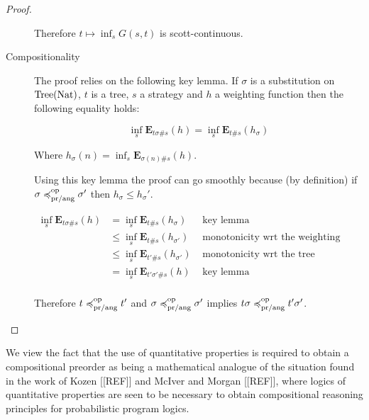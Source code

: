 \begin{proof}
\begin{description}
            Therefore $t \mapsto \inf_s G(s,t)$ is scott-continuous.
        \item[Compositionality]

            The proof relies on the following key lemma. 
            If $\sigma$ is a substitution on $\textnormal{Tree}(\textnormal{Nat})$,
            $t$ is a tree, $s$ a strategy and $h$ a weighting function then
            the following equality holds:


            \begin{equation*}
                \inf_s \mathbf{E}_{t\sigma \# s } (h)
                = 
                \inf_s \mathbf{E}_{t \# s} (h_\sigma)
            \end{equation*}

            Where $h_\sigma (n) = \inf_s \mathbf{E}_{\sigma(n) \# s} (h)$.

            
            Using this key lemma the proof can go smoothly because (by
            definition)
            if $\sigma \preccurlyeq^{\text{op}}_{\text{pr/ang}} \sigma'$ then 
            $h_\sigma \leq h_\sigma'$.

            \begin{align*}
                \inf_s \mathbf{E}_{t\sigma \# s} (h)
                 & = \inf_s \mathbf{E}_{t \# s} (h_\sigma)       & \text{ key lemma }  \\
                 & \leq \inf_s \mathbf{E}_{t \# s} (h_{\sigma'}) & \text{ monotonicity wrt the weighting function } \\
                 & \leq \inf_s \mathbf{E}_{t'\# s} (h_{\sigma'}) & \text{ monotonicity wrt the tree } \\
                 & = \inf_s \mathbf{E}_{t'\sigma' \# s} (h )     & \text{ key lemma } \\
            \end{align*}

            Therefore $ t \preccurlyeq^{\text{op}}_{\text{pr/ang}} t'$ and $\sigma
            \preccurlyeq^{\text{op}}_{\text{pr/ang}} \sigma'$ implies $t\sigma \preccurlyeq^{\text{op}}_{\text{pr/ang}}
            t'\sigma'$.
    \end{description}

\end{proof}

We view the fact that the use of quantitative properties is required to obtain a compositional preorder as being
a mathematical analogue of the situation found in the work of Kozen [[REF]] and McIver and Morgan [[REF]], where 
logics of quantitative properties are seen to be necessary to obtain compositional reasoning principles for 
probabilistic program logics.
